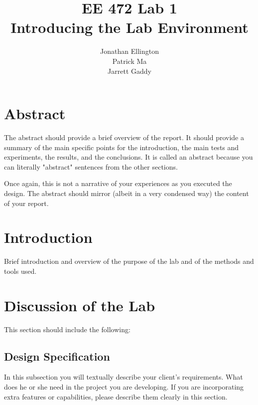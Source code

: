 \documentclass[12pt]{article} %
\title{\TitleFont EE 472 Lab 1 \\ Introducing the Lab Environment \vfill }
\author{\AuthorFont Jonathan Ellington \\ Patrick Ma \\ Jarrett Gaddy}
\date{}
\begin{document}
\maketitle
\thispagestyle{empty}
\pagebreak
\tableofcontents
\listoftables
\listoffigures
\thispagestyle{empty}
\pagebreak
\setcounter{page}{1}

\section{Abstract}
The abstract should provide a brief overview of the report.  It should provide a summary of the main specific points for the introduction, the main tests and experiments, the results, and the conclusions. It is called an abstract because you can literally "abstract" sentences from the other sections. 

Once again, this is not a narrative of your experiences as you executed the design.  The abstract should mirror (albeit in a very condensed way) the content of your report.

\section{Introduction}
Brief introduction and overview of the purpose of the lab and of the methods and tools used.

\section{Discussion of the Lab}

This section should include the following:

\subsection{Design Specification}

In this subsection you will textually describe your client's requirements.  What does he or she need in the project you are developing.  If you are incorporating extra features or capabilities, please describe them clearly in this section.
\end{document}
